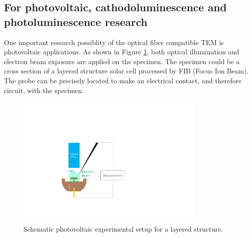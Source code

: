 \subsection{For photovoltaic, cathodoluminescence and photoluminescence research}
One important research possiblity of the optical fiber compatible TEM is photovoltaic applications. 
As shown in Figure \ref{fig:2_sc}, both optical illumination and electron beam exposure are applied on the specimen. The specimen could be a cross section of a layered structure solar cell processed by FIB (Focus Ion Beam). The probe can be precisely located to make an electrical contact, and therefore circuit, with the specimen. 
\begin{figure}  
\centering
\includegraphics[width=260pt,angle=-90]{figures/figure2_sc}
\caption[Photovoltaic research inside TEM.]{Schematic photovoltaic experimental setup for a layered structure.
\label{fig:2_sc}}
\end{figure}

